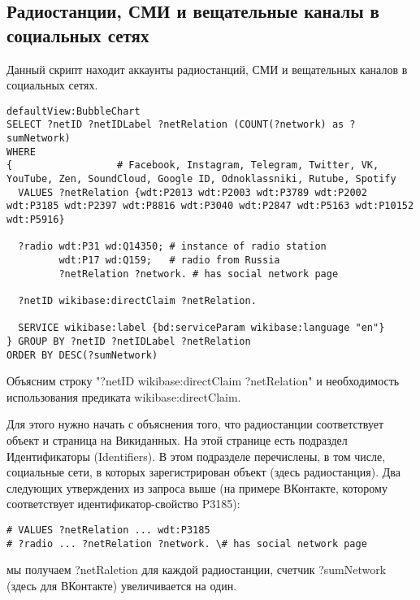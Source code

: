 \newpage

\subsection{Радиостанции, СМИ и вещательные каналы в социальных сетях}

Данный скрипт находит аккаунты радиостанций, СМИ и вещательных каналов в социальных сетях.

\begin{lstlisting}defaultView:BubbleChart
SELECT ?netID ?netIDLabel ?netRelation (COUNT(?network) as ?sumNetwork)
WHERE
{                  # Facebook, Instagram, Telegram, Twitter, VK, YouTube, Zen, SoundCloud, Google ID, Odnoklassniki, Rutube, Spotify
  VALUES ?netRelation {wdt:P2013 wdt:P2003 wdt:P3789 wdt:P2002 wdt:P3185 wdt:P2397 wdt:P8816 wdt:P3040 wdt:P2847 wdt:P5163 wdt:P10152 wdt:P5916}
  
  ?radio wdt:P31 wd:Q14350; # instance of radio station
         wdt:P17 wd:Q159;   # radio from Russia
         ?netRelation ?network. # has social network page

  ?netID wikibase:directClaim ?netRelation.
  
  SERVICE wikibase:label {bd:serviceParam wikibase:language "en"}
} GROUP BY ?netID ?netIDLabel ?netRelation 
ORDER BY DESC(?sumNetwork)\end{lstlisting}%


Объясним строку "?netID wikibase:directClaim ?netRelation" и необходимость использования предиката wikibase:directClaim.

Для этого нужно начать с объяснения того, что радиостанции соответствует объект и страница на Викиданных. На этой странице есть подраздел Идентификаторы (Identifiers). В этом подразделе перечислены, в том числе, социальные сети, в которых зарегистрирован объект (здесь радиостанция). Два следующих утверждених из запроса выше (на примере ВКонтакте, которому соответствует идентификатор-свойство P3185):

\begin{lstlisting}
# VALUES ?netRelation ... wdt:P3185
# ?radio ... ?netRelation ?network. \# has social network page
\end{lstlisting}

мы получаем ?netRaletion для каждой радиостанции, счетчик ?sumNetwork (здесь для ВКонтакте) увеличивается на один.

